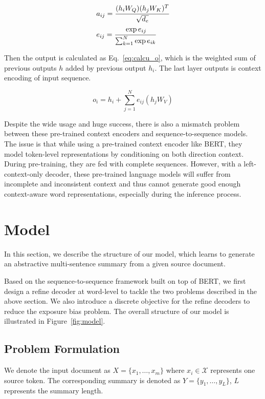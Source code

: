 \documentclass{article}
\begin{document}
\begin{eqnarray}
    &a_{ij} = \cfrac {(h_iW_Q)(h_jW_K)^T}  {\sqrt{d_e}} \label{eq:calcu_a} \\
    &e_{ij} = \cfrac {\exp{e_{ij}}} {\sum_{k=1}^N\exp{e_{ik}}} \label{eq:calcu_e}
\end{eqnarray}

Then the output is calculated as Eq.~\eqref{eq:calcu_o}, which is the weighted sum of previous outputs $h$ added by previous output $h_i$. The last layer outputs is context encoding of input sequence.

\begin{equation}
    o_i = h_i + \sum_{j=1}^{N} e_{ij}(h_j W_V) \label{eq:calcu_o}
\end{equation}

Despite the wide usage and huge success, there is also a mismatch problem between these pre-trained context encoders and sequence-to-sequence models. The issue is that while using a pre-trained context encoder like BERT, they model token-level representations by conditioning on both direction context. During pre-training, they are fed with complete sequences. However, with a left-context-only decoder, these pre-trained language models will suffer from incomplete and inconsistent context and thus cannot generate good enough context-aware word representations, especially during the inference process. 

\section{Model}

In this section, we describe the structure of our model, which learns to generate an abstractive multi-sentence summary from a given source document. 

Based on the sequence-to-sequence framework built on top of BERT, we first design a refine decoder at word-level to tackle the two problems described in the above section. We also introduce a discrete objective for the refine decoders to reduce the exposure bias problem. The overall structure of our model is illustrated in Figure~\ref{fig:model}. 

\subsection{Problem Formulation}

We denote the input document as $X = \{x_1, \ldots, x_m\}$ where $x_i \in \mathcal{X}$ represents one source token. The corresponding summary is denoted as $Y = \{y_1, \ldots, y_L\}$, $L$ represents the summary length.
\end{document}
